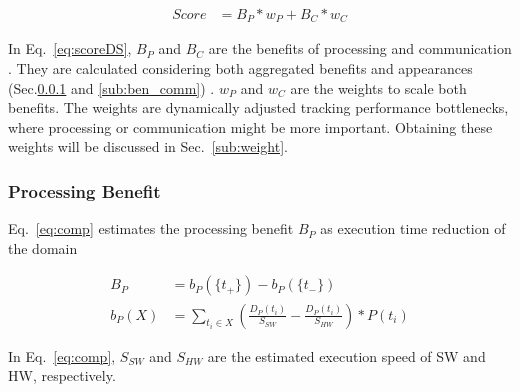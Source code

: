 \begingroup\makeatletter{}\check@mathfonts
\begin{equation}
\begin{split}
\label{eq:scoreDS}
	Score &= B_{P} * w_{P} + B_{C} * w_{C}
\end{split}
\end{equation}
\endgroup

In Eq.~\eqref{eq:scoreDS}, $B_P$ and $B_C$ are the benefits of processing and communication . They are calculated considering both aggregated benefits and appearances (Sec.\ref{sub:ben_proc} and \ref{sub:ben_comm}) . $w_P$ and $w_C$ are the weights to scale both benefits. The weights are dynamically adjusted tracking performance bottlenecks, where processing or communication might be more important. Obtaining these weights will be discussed in Sec.~\ref{sub:weight}. %


\subsubsection{Processing Benefit}
\label{sub:ben_proc}
Eq.~\ref{eq:comp} estimates the processing benefit $B_P$ as execution time reduction of the domain 

\begingroup\makeatletter{}\check@mathfonts
\begin{equation}
\begin{split}
\label{eq:comp}
    B_{P} &= b_{P}(\{t_{+}\}) - b_{P}(\{t_{-}\}) \\
	b_{P}(X) &= \sum_{ t_{i} \in X } (\frac{D_{P}(t_{i})}{S_{SW}} - \frac{D_{P}(t_{i})}{S_{HW}}) * P(t_{i})
\end{split}
\end{equation}
\endgroup

In Eq.~\ref{eq:comp}, $S_{SW}$ and $S_{HW}$ are the estimated execution speed of SW and HW, respectively. 
 
